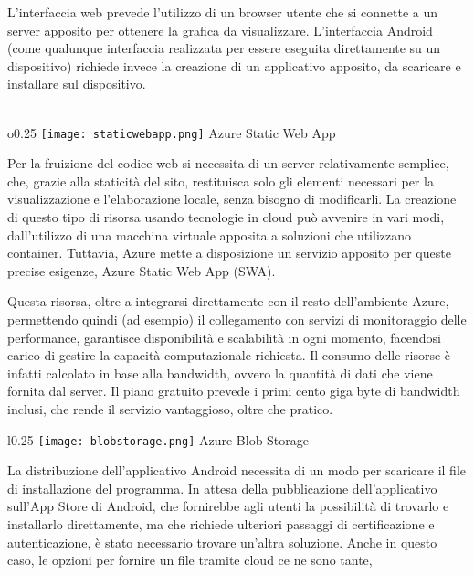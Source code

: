 L'interfaccia web prevede l'utilizzo di un browser utente che si connette a un server apposito
per ottenere la grafica da visualizzare.
L'interfaccia Android (come qualunque interfaccia realizzata per essere eseguita direttamente su un dispositivo)
richiede invece la creazione di un applicativo apposito,
da scaricare e installare sul dispositivo.\\
\\
\begin{wrapfigure}{o}{0.25\textwidth}
    \centering
    \texttt{[image: staticwebapp.png]}
    Azure Static Web App
\end{wrapfigure}
Per la fruizione del codice web si necessita di un server relativamente semplice,
che, grazie alla staticità del sito,
restituisca solo gli elementi necessari per la visualizzazione e l'elaborazione locale,
senza bisogno di modificarli.
La creazione di questo tipo di risorsa usando tecnologie in cloud può avvenire in vari modi,
dall'utilizzo di una macchina virtuale apposita a soluzioni che utilizzano container.
Tuttavia, Azure mette a disposizione un servizio apposito per queste precise esigenze,
Azure Static Web App (SWA).\newline
\par
Questa risorsa, oltre a integrarsi direttamente con il resto dell'ambiente Azure,
permettendo quindi (ad esempio) il collegamento con servizi di monitoraggio delle performance,
garantisce disponibilità e scalabilità in ogni momento,
facendosi carico di gestire la capacità computazionale richiesta.
Il consumo delle risorse è infatti calcolato in base alla bandwidth,
ovvero la quantità di dati che viene fornita dal server.
Il piano gratuito prevede i primi cento giga byte di bandwidth inclusi,
che rende il servizio vantaggioso, oltre che pratico.\newline
\begin{wrapfigure}{l}{0.25\textwidth}
    \centering
    \texttt{[image: blobstorage.png]}
    Azure Blob Storage
\end{wrapfigure}
La distribuzione dell'applicativo Android
necessita di un modo per scaricare il file di installazione del programma.
In attesa della pubblicazione dell'applicativo sull'App Store di Android,
che fornirebbe agli utenti la possibilità di trovarlo e installarlo direttamente,
ma che richiede ulteriori passaggi di certificazione e autenticazione,
è stato necessario trovare un'altra soluzione.
Anche in questo caso,
le opzioni per fornire un file tramite cloud ce ne sono tante,
